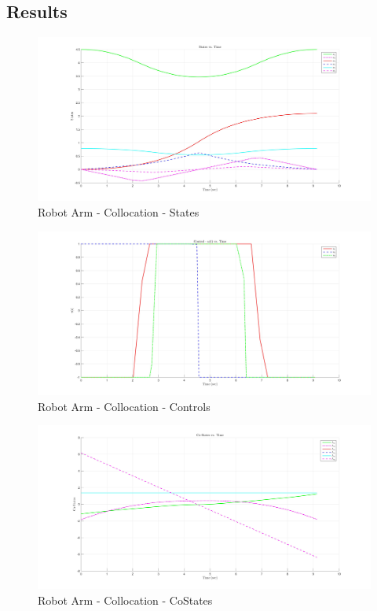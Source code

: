 \documentclass[11pt,usenames]{article}
\begin{document}
	
	
	
	
	
	
	\newpage
	
	
	\subsection{Results}
	
	\begin{figure}[htpb]
		\centering
		\includegraphics[scale=0.13]{RobotArm_States.jpg}
		\caption{Robot Arm - Collocation - States}
	\end{figure}
	
	\begin{figure}[htpb]
		\centering
		\includegraphics[scale=0.13]{RobotArm_Control.jpg}
		\caption{Robot Arm - Collocation - Controls}
	\end{figure}
	
	\begin{figure}[htpb]
		\centering
		\includegraphics[scale=0.13]{RobotArm_CoStates.jpg}
		\caption{Robot Arm - Collocation - CoStates}
	\end{figure}
	
\end{document}
